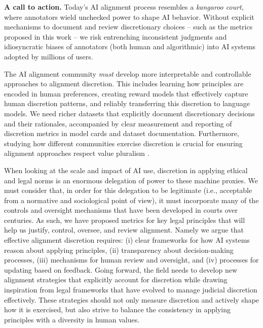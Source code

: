 \documentclass{article}
\begin{document}
\noindent\textbf{A call to action.} Today's AI alignment process resembles a \textit{kangaroo court}, where annotators wield unchecked power to shape AI behavior. Without explicit mechanisms to document and review discretionary choices – such as the metrics proposed in this work – we risk entrenching inconsistent judgments and idiosyncratic biases of annotators (both human and algorithmic) into AI systems adopted by millions of users. 

The AI alignment community \textit{must} develop more interpretable and controllable approaches to alignment discretion. This includes learning how principles are encoded in human preferences, creating reward models that effectively capture human discretion patterns, and reliably transferring this discretion to language models.  We need richer datasets that explicitly document discretionary decisions and their rationales, accompanied by clear measurement and reporting of discretion metrics in model cards and dataset documentation. Furthermore, studying how different communities exercise discretion is crucial for ensuring alignment approaches respect value pluralism \cite{sorensenValueKaleidoscopeEngaging2024, berlin2014two}.


When looking at the scale and impact of AI use, discretion in applying ethical and legal norms is an enormous delegation of power to these machine proxies. We must consider that, in order for this delegation to be legitimate (i.e., acceptable from a normative and sociological point of view), it must incorporate many of the controls and oversight mechanisms that have been developed in courts over centuries. As such, we have proposed metrics for key legal principles that will help us justify, control, oversee, and review alignment. Namely we argue that effective alignment discretion requires: (i) clear frameworks for how AI systems reason about applying principles, (ii) transparency about decision-making processes, (iii) mechanisms for human review and oversight, and (iv) processes for updating based on feedback. Going forward, the field needs to develop new alignment strategies that explicitly account for discretion  while drawing inspiration from legal frameworks that have evolved to manage judicial discretion effectively. These strategies should not only measure discretion and actively shape how it is exercised, but also strive to balance the consistency in applying principles with a diversity in human values.
\end{document}
